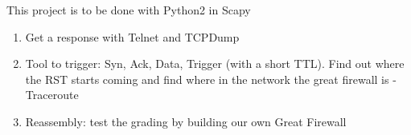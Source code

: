 \documentclass{article}
\begin{document}
This project is to be done with Python2 in Scapy
\begin{enumerate}
\item Get a response with Telnet and TCPDump
\item Tool to trigger: Syn, Ack, Data, Trigger (with a short TTL). Find out where the RST starts coming and find where in the network the great firewall is
-Traceroute
\item Reassembly:  test the grading by building our own Great Firewall
\end{enumerate}
\end{document}
